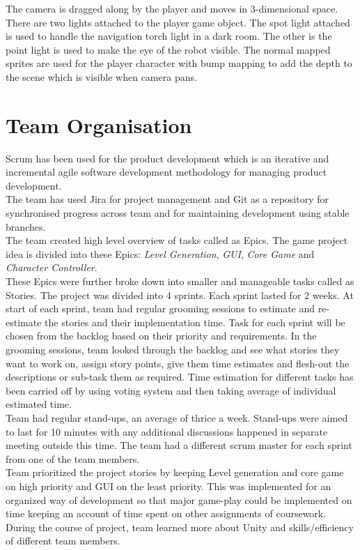 \documentclass[11pt]{article}
\begin{document}
The camera is dragged along by the player and moves in 3-dimensional space. There are two lights attached to the player game object. The spot light attached is used to handle the navigation torch light in a dark room. The other is the point light is used to make the eye of the robot visible. The normal mapped sprites are used for the player character with bump mapping to add the depth to the scene which is visible when camera pans.
\section{Team Organisation}
Scrum has been used for the product development which is an iterative and incremental agile software development methodology for managing product development.\\

The team has used Jira for project management and Git as a repository for synchronised progress across team and for  maintaining development using stable branches.\\

The team created high level overview of tasks called as Epics. The game project idea is divided into these Epics: \textit{Level Generation}, \textit{GUI}, \textit{Core Game} and \textit{Character Controller}.\\

These Epics were further broke down into smaller and manageable tasks called as Stories. The project was divided into 4 sprints. Each sprint lasted for 2 weeks. At start of each sprint, team had regular grooming sessions to estimate and re-estimate the stories and their implementation time. Task for each sprint will be chosen from the backlog based on their priority and requirements. In the grooming sessions, team looked through the backlog and see what stories they want to work on, assign story points, give them time estimates and flesh-out the descriptions or sub-task them as required. Time estimation for different tasks has been carried off by using voting system and then taking average of individual estimated time.\\

Team had regular stand-ups, an average of thrice a week. Stand-ups were aimed to last for 10 minutes with any additional discussions happened in separate meeting outside this time. The team had a different scrum master for each sprint from one of the team members.\\

Team prioritized the project stories by keeping Level generation and core game on high priority and GUI on the least priority. This was implemented for an organized way of development so that major game-play could be implemented on time keeping an account of time spent on other assignments of coursework. During the course of project, team learned more about Unity and skills/efficiency of different team members.
\end{document}
